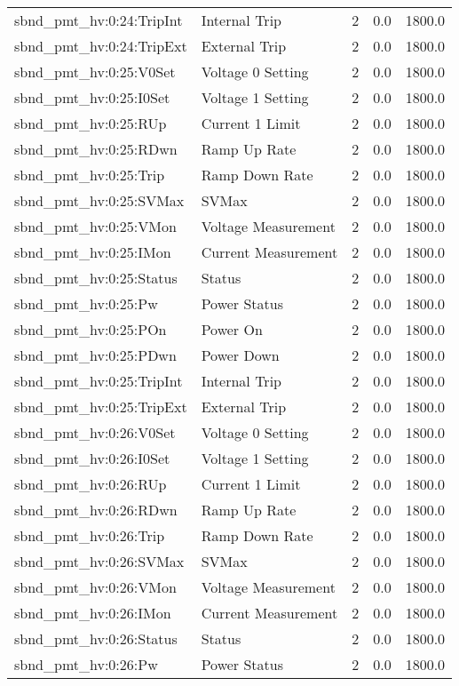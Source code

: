 \begin{center}
\begin{longtable}{l | l l l l }
sbnd\_pmt\_hv:0:24:TripInt & Internal Trip & 2 & 0.0 & 1800.0\\ 
sbnd\_pmt\_hv:0:24:TripExt & External Trip & 2 & 0.0 & 1800.0\\ 
sbnd\_pmt\_hv:0:25:V0Set & Voltage 0 Setting & 2 & 0.0 & 1800.0\\ 
sbnd\_pmt\_hv:0:25:I0Set & Voltage 1 Setting & 2 & 0.0 & 1800.0\\ 
sbnd\_pmt\_hv:0:25:RUp & Current 1 Limit & 2 & 0.0 & 1800.0\\ 
sbnd\_pmt\_hv:0:25:RDwn & Ramp Up Rate & 2 & 0.0 & 1800.0\\ 
sbnd\_pmt\_hv:0:25:Trip & Ramp Down Rate & 2 & 0.0 & 1800.0\\ 
sbnd\_pmt\_hv:0:25:SVMax & SVMax & 2 & 0.0 & 1800.0\\ 
sbnd\_pmt\_hv:0:25:VMon & Voltage Measurement & 2 & 0.0 & 1800.0\\ 
sbnd\_pmt\_hv:0:25:IMon & Current Measurement & 2 & 0.0 & 1800.0\\ 
sbnd\_pmt\_hv:0:25:Status & Status & 2 & 0.0 & 1800.0\\ 
sbnd\_pmt\_hv:0:25:Pw & Power Status & 2 & 0.0 & 1800.0\\ 
sbnd\_pmt\_hv:0:25:POn & Power On & 2 & 0.0 & 1800.0\\ 
sbnd\_pmt\_hv:0:25:PDwn & Power Down & 2 & 0.0 & 1800.0\\ 
sbnd\_pmt\_hv:0:25:TripInt & Internal Trip & 2 & 0.0 & 1800.0\\ 
sbnd\_pmt\_hv:0:25:TripExt & External Trip & 2 & 0.0 & 1800.0\\ 
sbnd\_pmt\_hv:0:26:V0Set & Voltage 0 Setting & 2 & 0.0 & 1800.0\\ 
sbnd\_pmt\_hv:0:26:I0Set & Voltage 1 Setting & 2 & 0.0 & 1800.0\\ 
sbnd\_pmt\_hv:0:26:RUp & Current 1 Limit & 2 & 0.0 & 1800.0\\ 
sbnd\_pmt\_hv:0:26:RDwn & Ramp Up Rate & 2 & 0.0 & 1800.0\\ 
sbnd\_pmt\_hv:0:26:Trip & Ramp Down Rate & 2 & 0.0 & 1800.0\\ 
sbnd\_pmt\_hv:0:26:SVMax & SVMax & 2 & 0.0 & 1800.0\\ 
sbnd\_pmt\_hv:0:26:VMon & Voltage Measurement & 2 & 0.0 & 1800.0\\ 
sbnd\_pmt\_hv:0:26:IMon & Current Measurement & 2 & 0.0 & 1800.0\\ 
sbnd\_pmt\_hv:0:26:Status & Status & 2 & 0.0 & 1800.0\\ 
sbnd\_pmt\_hv:0:26:Pw & Power Status & 2 & 0.0 & 1800.0\\ 

\end{longtable}
\end{center}
